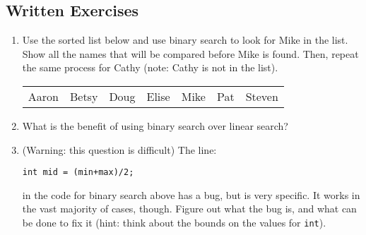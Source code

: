 \subsection{Written Exercises}

\begin{enumerate}

\item Use the sorted list below and use binary search to look for Mike in the list. Show all the names that will be compared before Mike is found. Then, repeat the same process for Cathy (note: Cathy is not in the list).
\begin{table}[h]
\begin{tabular}{lllllll}
Aaron & Betsy & Doug & Elise & Mike & Pat & Steven
\end{tabular}
\end{table}

\item What is the benefit of using binary search over linear search?

\item (Warning: this question is difficult) The line:
\begin{lstlisting}
int mid = (min+max)/2;
\end{lstlisting}
in the code for binary search above has a bug, but is very specific. It works in the vast majority of cases, though. Figure out what the bug is, and what can be done to fix it (hint: think about the bounds on the values for \verb|int|).

\end{enumerate}
